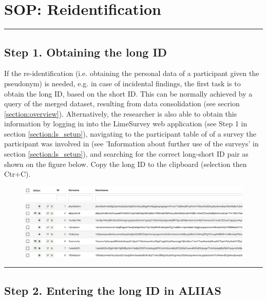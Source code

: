 \pagebreak
\section{SOP: Reidentification}
\label{section:sop_reidentification}

\par\noindent\rule{\textwidth\color{pniblue}}{0.4pt}
\subsection*{Step 1. Obtaining the long ID}

If the re-identification (i.e. obtaining the personal data of a participant given the pseudonym) is needed, e.g. in case of incidental findings, the first task is to obtain the long ID, based on the short ID.
This can be normally achieved by a query of the merged dataset, resulting from data consolidation (see secrion \ref{section:overview}). Alternatively, the researcher is also able to obtain this information by logging in into the LimeSurvey web application (see Step 1 in section \ref{section:ls_setup}), navigating to the participant table of of a survey the participant was involved in (see 'Information about further use of the surveys' in section \ref{section:ls_setup}), and searching for the correct long-short ID pair as shown on the figure below.
Copy the long ID to the clipboard (selection then Ctr+C).

\begin{figure}[H]
\includegraphics[width=1.0\textwidth]{docs/fig/ls_pseudonyms.png}
\end{figure}


\par\noindent\rule{\textwidth\color{pniblue}}{0.4pt}
\subsection*{Step 2. Entering the long ID in ALIIAS}

